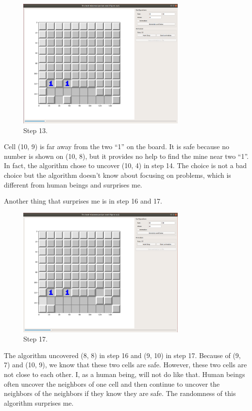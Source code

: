 \documentclass[letter]{article}
\begin{document}
\begin{enumerate}
	\begin{figure}[H]
	\centering
	\includegraphics[width=0.75\textwidth]{../pics/3.png}
	\caption{\label{fig:3} Step 13.}
	\end{figure}
	Cell (10, 9) is far away from the two ``1'' on the board. It is safe because no number is shown on (10, 8), but it provides no help to find the mine near two ``1''. In fact, the algorithm chose to uncover (10, 4) in step 14. The choice is not a bad choice but the algorithm doesn’t know about focusing on problems, which is different from human beings and surprises me.
	
	Another thing that surprises me is in step 16 and 17.
	
	\begin{figure}[H]
		\centering
		\includegraphics[width=0.75\textwidth]{../pics/4.png}
		\caption{\label{fig:4} Step 17.}
	\end{figure}
	The algorithm uncovered (8, 8) in step 16 and (9, 10) in step 17. Because of (9, 7) and (10, 9), we know that these two cells are safe. However, these two cells are not close to each other. I, as a human being, will not do like that. Human beings often uncover the neighbors of one cell and then continue to uncover the neighbors of the neighbors if they know they are safe. The randomness of this algorithm surprises me.
	

\end{enumerate}
\end{document}
